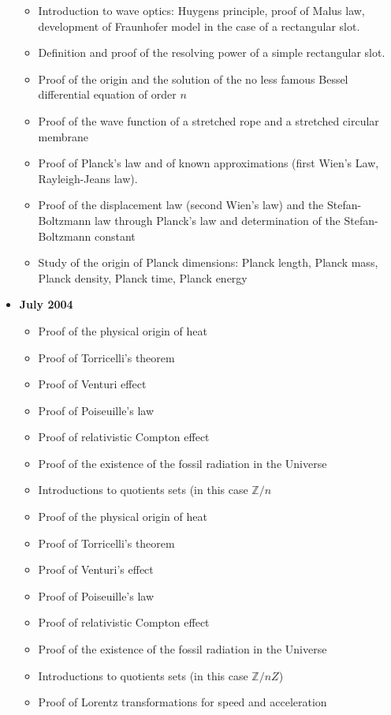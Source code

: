 \documentclass[12pt,a4paper,twoside,openright]{report}
\newcounter{quot}
\theoremstyle{definition}
\theoremstyle{itexmp}
\numberwithin{equation}{section}
\begin{document}
\begin{itemize}
\begin{itemize}[noitemsep]
			\item Introduction to wave optics: Huygens principle, proof of Malus law, development of Fraunhofer model in the case of a rectangular slot. 
			\item Definition and proof of the resolving power of a simple rectangular slot.
			\item Proof of the origin and the solution of the no less famous Bessel differential equation of order $n$
			\item Proof of the wave function of a stretched rope and a stretched circular membrane
			\item Proof of Planck's law and of known approximations (first Wien's Law, Rayleigh-Jeans law).
			\item Proof of the displacement law (second Wien's law) and the Stefan-Boltzmann law through Planck's law and determination of the Stefan-Boltzmann constant
			\item Study of the origin of Planck dimensions: Planck length, Planck mass, Planck density, Planck time, Planck energy
		\end{itemize}
	\item \textbf{July 2004}
		\begin{itemize}[noitemsep]
			\item Proof of the physical origin of heat
			\item Proof of Torricelli's theorem
			\item Proof of Venturi effect
			\item Proof of Poiseuille's law
			\item Proof of relativistic Compton effect
			\item Proof of the existence of the fossil radiation in the Universe
			\item Introductions to quotients sets (in this case $\mathbb{Z}/n$
			\item Proof of the physical origin of heat
			\item Proof of Torricelli's theorem
			\item Proof of Venturi's effect
			\item Proof of Poiseuille's law
			\item Proof of relativistic Compton effect
			\item Proof of the existence of the fossil radiation in the Universe
			\item Introductions to quotients sets (in this case $\mathbb{Z}/nZ$)
			\item Proof of Lorentz transformations for speed and acceleration

\end{itemize}
\end{itemize}
\end{document}
